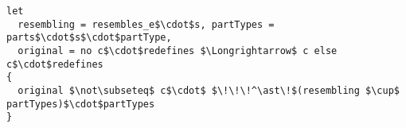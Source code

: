 \lstset{frame=tb, aboveskip=12pt, belowskip=-3pt, breaklines=true, basicstyle=\small\ttfamily, tabsize=2, mathescape=true}
\begin{lstlisting}[caption={wellformed\_components.als, lines 19-24}, label=alloy:WF_COMPONENT_CONTAINMENT, captionpos=b]
let
  resembling = resembles_e$\cdot$s, partTypes = parts$\cdot$s$\cdot$partType,
  original = no c$\cdot$redefines $\Longrightarrow$ c else c$\cdot$redefines
{
  original $\not\subseteq$ c$\cdot$ $\!\!\!^\ast\!$(resembling $\cup$ partTypes)$\cdot$partTypes
}
\end{lstlisting}